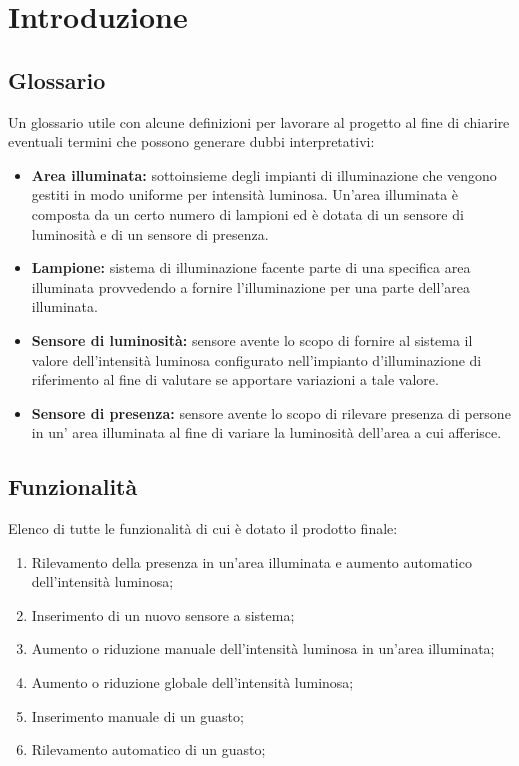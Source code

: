 \chapter{Introduzione}

\section{Glossario}
Un glossario utile con alcune definizioni per lavorare al progetto al fine di chiarire eventuali termini che possono generare
dubbi interpretativi:
\begin{itemize}
    \item \textbf{Area illuminata:} sottoinsieme degli impianti di illuminazione che vengono gestiti in
modo uniforme per intensità luminosa. Un'area illuminata è composta da un certo numero di lampioni ed è dotata di un sensore 
di luminosità e di un sensore di presenza.
    \item \textbf{Lampione:} sistema di illuminazione facente parte di una specifica area illuminata provvedendo a fornire 
    l'illuminazione per una parte dell'area illuminata.
    \item \textbf{Sensore di luminosità:} sensore avente lo scopo di fornire al sistema il valore dell'intensità luminosa 
    configurato nell'impianto d'illuminazione di riferimento al fine di valutare se apportare variazioni a tale valore.
    \item \textbf{Sensore di presenza:} sensore avente lo scopo di rilevare presenza di persone in un' area illuminata al fine 
    di variare la luminosità dell'area a cui afferisce.
\end{itemize}

\section{Funzionalità}
Elenco di tutte le funzionalità di cui è dotato il prodotto finale:
\begin{enumerate}
    \item Rilevamento della presenza in un'area illuminata e aumento automatico dell'intensità luminosa;
    \item Inserimento di un nuovo sensore a sistema;
    \item Aumento o riduzione manuale dell'intensità luminosa in un'area illuminata;
    \item Aumento o riduzione globale dell'intensità luminosa;
    \item Inserimento manuale di un guasto;
    \item Rilevamento automatico di un guasto;
\end{enumerate}
